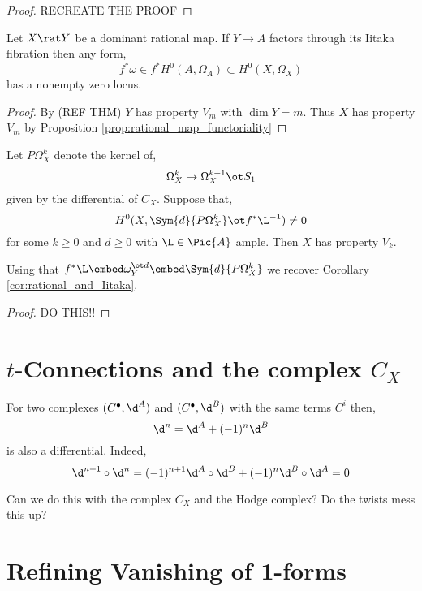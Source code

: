 \documentclass[12pt]{article}
\begin{document}
\begin{proof}
RECREATE THE PROOF
\end{proof}

\begin{cor} \label{cor:rational_and_Iitaka}
Let $X \rat Y$ be a dominant rational map. If $Y \to A$ factors through its Iitaka fibration then any form,
\[ f^* \omega \in f^* H^0(A, \Omega_A) \subset H^0(X, \Omega_X) \]
has a nonempty zero locus.  
\end{cor}

\begin{proof}
By (REF THM) $Y$ has property $V_m$ with $\dim{Y} = m$. Thus $X$ has property $V_m$ by Proposition \ref{prop:rational_map_functoriality}
\end{proof}

\begin{theorem}
Let $P \Omega^k_X$ denote the kernel of,
\[ \Omega^k_X \to \Omega^{k+1}_X \ot S_1 \]
given by the differential of $C_X$. Suppose that,
\[ H^0(X, \Sym{d}{P \Omega^k_X} \ot f^* \L^{-1}) \neq 0 \]
for some $k \ge 0$ and $d \ge 0$ with $\L \in \Pic{A}$ ample. Then $X$ has property $V_k$. 
\end{theorem}

\begin{rmk}
Using that $f^* \L \embed \omega_Y^{\ot d} \embed \Sym{d}{P \Omega^k_X}$ we recover Corollary \ref{cor:rational_and_Iitaka}. 
\end{rmk}

\begin{proof}
DO THIS!!
\end{proof}

\section{$t$-Connections and the complex $C_X$}

For two complexes $(C^\bullet, \d^A)$ and $(C^\bullet, \d^B)$ with the same terms $C^i$ then,
\[ \d^n = \d^A + (-1)^n \d^B \]
is also a differential. Indeed,
\[ \d^{n+1} \circ \d^n = (-1)^{n+1} \d^A \circ \d^B + (-1)^{n} \d^B \circ \d^A = 0 \]

Can we do this with the complex $C_X$ and the Hodge complex? Do the twists mess this up?




\section{Refining Vanishing of 1-forms}
\end{document}
